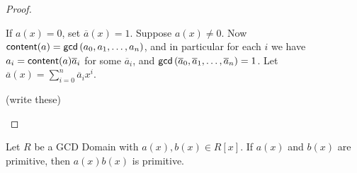 \begin{proof}
\begin{inlineproplist}
\item If \(a(x) = 0\), set \(\overline{a}(x) = 1\). Suppose \(a(x) \neq 0\). Now \(\mathsf{content}(a) = \mathsf{gcd}\left(a_0,a_1,\ldots,a_n\right)\), and in particular for each \(i\) we have \(a_i = \mathsf{content}(a)\overline{a}_i\) for some \(\overline{a}_i\), and \(\mathsf{gcd}\left(\overline{a}_0, \overline{a}_1, \ldots, \overline{a}_n\right) = 1\). Let \(\overline{a}(x) = \sum_{i=0}^n \overline{a}_i x^i\).

\item (write these)
\end{inlineproplist}
\end{proof}

\begin{prop} \label{prop:gauss-lemma-1}
Let \(R\) be a GCD Domain with \(a(x), b(x) \in R[x]\). If \(a(x)\) and \(b(x)\) are primitive, then \(a(x)b(x)\) is primitive.
\end{prop}


